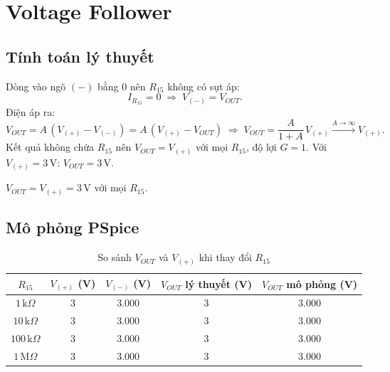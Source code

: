 \section{Voltage Follower}\label{sec:follower}

\subsection{Tính toán lý thuyết}
Dòng vào ngõ $(-)$ bằng $0$ nên $R_{15}$ không có sụt áp:
\[
I_{R_{15}} = 0 \;\Rightarrow\; V_{(-)} = V_{OUT}.
\]
Điện áp ra:
\[
V_{OUT} = A\,(V_{(+)} - V_{(-)}) = A\,(V_{(+)} - V_{OUT})
\;\Rightarrow\; V_{OUT} = \frac{A}{1+A}\,V_{(+)} \xrightarrow{A\to\infty} V_{(+)}.
\]
Kết quả không chứa $R_{15}$ nên $V_{OUT} = V_{(+)}$ với mọi $R_{15}$, độ lợi $G = 1$. Với $V_{(+)} = 3\,\text{V}$: $V_{OUT} = 3\,\text{V}$.

\begin{dapsobox}
$V_{OUT} = V_{(+)} = 3\,\text{V}$ với mọi $R_{15}$.
\end{dapsobox}

\subsection{Mô phỏng PSpice}
\simresult
{}

\begin{table}[H]
\centering
\begin{tabular}{c c c c c}
\toprule
$R_{15}$ & $V_{(+)}$ (V) & $V_{(-)}$ (V) & $V_{OUT}$ lý thuyết (V) & $V_{OUT}$ mô phỏng (V)\\
\midrule
$1\,\text{k}\Omega$   & 3 & 3.000 & 3 & 3.000\\
$10\,\text{k}\Omega$  & 3 & 3.000 & 3 & 3.000\\
$100\,\text{k}\Omega$ & 3 & 3.000 & 3 & 3.000\\
$1\,\text{M}\Omega$   & 3 & 3.000 & 3 & 3.000\\
\bottomrule
\end{tabular}
\caption{So sánh $V_{OUT}$ và $V_{(+)}$ khi thay đổi $R_{15}$}
\end{table}
